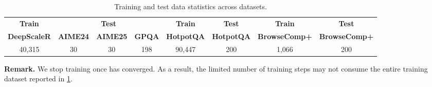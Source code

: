 \begin{table}[h]
\centering
\small
\setlength{\tabcolsep}{10pt}
\begin{tabular}{c c c c c c c c}
\toprule
\multicolumn{1}{c}{\textbf{Train}} 
& \multicolumn{3}{c}{\textbf{Test}} 
& \multicolumn{1}{c}{\textbf{Train}} 
& \multicolumn{1}{c}{\textbf{Test}} 
& \multicolumn{1}{c}{\textbf{Train}} 
& \multicolumn{1}{c}{\textbf{Test}} \\
\cmidrule(lr){2-4}
\textbf{DeepScaleR}
& \textbf{AIME24}
& \textbf{AIME25}
& \textbf{GPQA}
& \textbf{HotpotQA}
& \textbf{HotpotQA}
& \textbf{BrowseComp+}
& \textbf{BrowseComp+} \\
\midrule
40,315 & 30 & 30 & 198 & 90,447 & 200 & 1,066 & 200 \\
\bottomrule
\end{tabular}
\caption{Training and test data statistics across datasets.}
\label{tab:dataset_stats}
\end{table}

\textbf{Remark.} We stop training once \ourframework has converged. As a result, the limited number of training steps may not consume the entire training dataset reported in \cref{tab:dataset_stats}.

